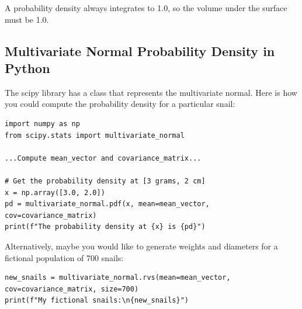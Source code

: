 A probability density always integrates to 1.0, so the volume under the surface must be 1.0.

\subsection{Multivariate Normal Probability Density in Python}

The scipy library has a class that represents the multivariate normal. Here is how you could compute the probability density for a particular snail:

\begin{verbatim}
import numpy as np
from scipy.stats import multivariate_normal

...Compute mean_vector and covariance_matrix...

# Get the probability density at [3 grams, 2 cm]
x = np.array([3.0, 2.0])
pd = multivariate_normal.pdf(x, mean=mean_vector, cov=covariance_matrix)
print(f"The probability density at {x} is {pd}")
\end{verbatim}

Alternatively, maybe you would like to generate weights and diameters for a fictional population of 700 snails:

\begin{verbatim}
new_snails = multivariate_normal.rvs(mean=mean_vector, cov=covariance_matrix, size=700)
print(f"My fictional snails:\n{new_snails}")
\end{verbatim}
